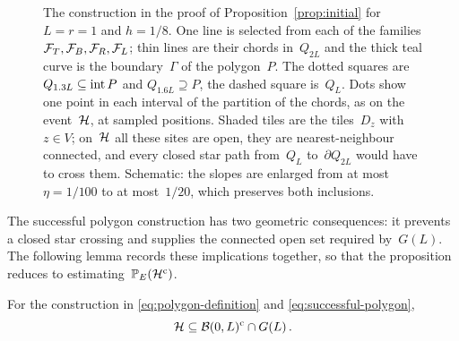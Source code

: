 \documentclass[11pt,letterpaper]{article}
\begin{document}
\begin{figure}[ht]
  \centering
  
  \caption{The construction in the proof of Proposition~\ref{prop:initial} for $L=r=1$ and $h=1/8$. One line is selected from each of the families $\mathcal F_T,\mathcal F_B,\mathcal F_R,\mathcal F_L$; thin lines are their chords in~$Q_{2L}$ and the thick teal curve is the boundary~$\Gamma$ of the polygon~$P$. The dotted squares are $Q_{1.3L}\subseteq\operatorname{int} P$ and $Q_{1.6L}\supseteq P$, the dashed square is~$Q_L$. Dots show one point in each interval of the partition of the chords, as on the event~$\mathcal H$, at sampled positions. Shaded tiles are the tiles~$D_z$ with $z\in V$; on~$\mathcal H$ all these sites are open, they are nearest-neighbour connected, and every closed star path from~$Q_L$ to~$\partial Q_{2L}$ would have to cross them. Schematic: the slopes are enlarged from at most $\eta=1/100$ to at most~$1/20$, which preserves both inclusions.}
  \label{fig:polygon}
\end{figure}

The successful polygon construction has two geometric consequences: it prevents a closed star crossing and supplies the connected open set required by~$G(L)$. The following lemma records these implications together, so that the proposition reduces to estimating~$\mathbb P_E(\mathcal H^{\mathrm{c}})$.

\begin{lemma}
\label{lem:initial-geometry}
For the construction in \eqref{eq:polygon-definition} and \eqref{eq:successful-polygon},
\begin{equation*}
  \mathcal H\subseteq\mathcal B(0,L)^{\mathrm{c}}\cap G(L)\,.
\end{equation*}
\end{lemma}
\end{document}
